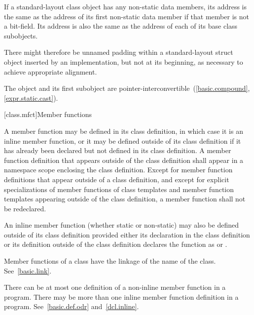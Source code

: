 \pnum
If a standard-layout class object has any non-static data members, its address
is the same as the address of its first non-static data member
if that member is not a bit-field. Its
address is also the same as the address of each of its base class subobjects.
\begin{note}
There might therefore be unnamed padding within a standard-layout struct object
inserted by an implementation, but
not at its beginning, as necessary to achieve appropriate alignment.
\end{note}
\begin{note}
The object and its first subobject are
pointer-interconvertible~(\ref{basic.compound}, \ref{expr.static.cast}).
\end{note}

[class.mfct]{Member functions}%

\pnum
{}%
%
A member function may be defined in its class
definition, in which case it is an inline member
function, or it may be defined outside of its class
definition if it has already been declared but not defined in its class
definition. A member function definition that appears outside of the
class definition shall appear in a namespace scope enclosing the class
definition. Except for member function definitions that appear outside
of a class definition, and except for explicit specializations of member
functions of class templates and member function
templates appearing outside of the class definition, a
member function shall not be redeclared.

\pnum
An inline member function (whether static or non-static) may
also be defined outside of its class definition provided either its
declaration in the class definition or its definition outside of the
class definition declares the function as  or .
\begin{note}
Member functions of a class have the linkage of the name of the class.
See~\ref{basic.link}.
\end{note}

\pnum
\begin{note}
There can be at most one definition of a non-inline member function in
a program. There may be more than one
inline member function definition in a program.
See~\ref{basic.def.odr} and~\ref{dcl.inline}.
\end{note}

